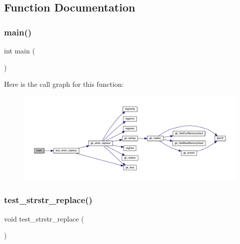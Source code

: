 \subsection{Function Documentation}
\mbox{\label{a00155_ae66f6b31b5ad750f1fe042a706a4e3d4}} 
\subsubsection{\texorpdfstring{main()}{main()}}
{\footnotesize\ttfamily int main (\begin{DoxyParamCaption}{ }\end{DoxyParamCaption})}

Here is the call graph for this function\+:\nopagebreak
\begin{figure}[H]
\begin{center}
\leavevmode
\includegraphics[width=350pt]{a00155_ae66f6b31b5ad750f1fe042a706a4e3d4_cgraph}
\end{center}
\end{figure}
\mbox{\label{a00155_a3666be16b4df33d86374ee780353af54}} 
\subsubsection{\texorpdfstring{test\+\_\+strstr\+\_\+replace()}{test\_strstr\_replace()}}
{\footnotesize\ttfamily void test\+\_\+strstr\+\_\+replace (\begin{DoxyParamCaption}{ }\end{DoxyParamCaption})}


